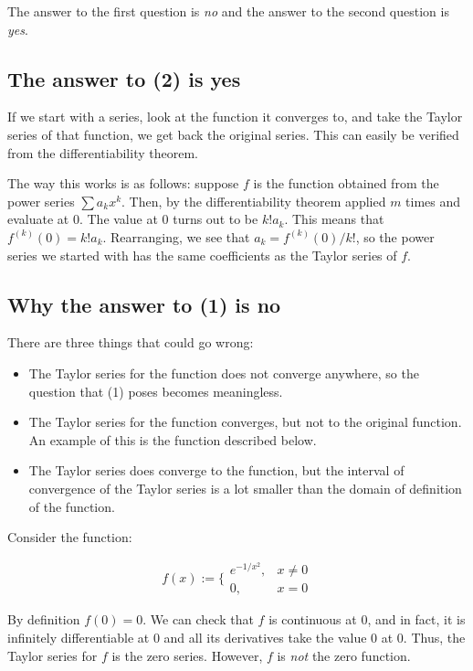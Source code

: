 \documentclass{amsart}
\begin{document}
The answer to the first question is {\em no} and the answer to the
second question is {\em yes}.

\subsection{The answer to (2) is yes}

If we start with a series, look at the function it converges to, and
take the Taylor series of that function, we get back the original
series. This can easily be verified from the differentiability theorem.

The way this works is as follows: suppose $f$ is the function obtained
from the power series $\sum a_kx^k$. Then, by the differentiability
theorem applied $m$ times and evaluate at $0$. The value at $0$ turns
out to be $k!a_k$. This means that $f^{(k)}(0) = k!a_k$. Rearranging,
we see that $a_ k = f^{(k)}(0)/k!$, so the power series we started
with has the same coefficients as the Taylor series of $f$.
\subsection{Why the answer to (1) is no}

There are three things that could go wrong:

\begin{itemize}
\item The Taylor series for the function does not converge anywhere,
  so the question that (1) poses becomes meaningless.
\item The Taylor series for the function converges, but not to the
  original function. An example of this is the function described below.
\item The Taylor series does converge to the function, but the
  interval of convergence of the Taylor series is a lot smaller than
  the domain of definition of the function.
\end{itemize}

Consider the function:

$$f(x) := \lbrace\begin{array}{rl}e^{-1/x^2}, & x \ne 0\\ 0, & x = 0 \end{array}$$

By definition $f(0) = 0$. We can check that $f$ is continuous at $0$,
and in fact, it is infinitely differentiable at $0$ and all its
derivatives take the value $0$ at $0$. Thus, the Taylor series for $f$
is the zero series. However, $f$ is {\em not} the zero function.
\end{document}
